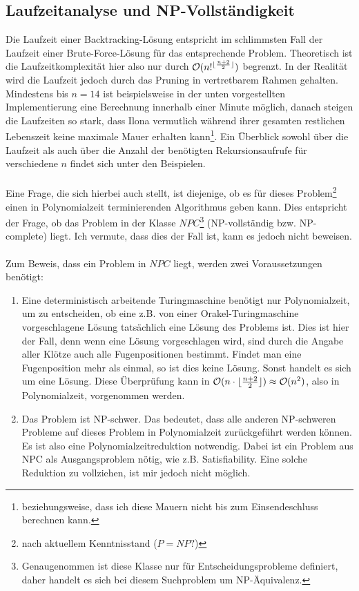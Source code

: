 \documentclass[a4paper, notitlepage, 12pt]{scrartcl}
\DeclarePairedDelimiter\floor{\lfloor}{\rfloor}
\begin{document}
\subsection{Laufzeitanalyse und NP-Vollständigkeit}
Die Laufzeit einer Backtracking-Lösung entspricht im schlimmsten Fall der Laufzeit einer Brute-Force-Lösung für das entsprechende Problem. Theoretisch ist die Laufzeitkomplexität hier also nur durch $\mathcal{O}(n!^{\floor{\frac{n + 2}{2}}})$ begrenzt. In der Realität wird die Laufzeit jedoch durch das Pruning in vertretbarem Rahmen gehalten. Mindestens bis $n = 14$ ist beispielsweise in der unten vorgestellten Implementierung eine Berechnung innerhalb einer Minute möglich, danach steigen die Laufzeiten so stark, dass Ilona vermutlich während ihrer gesamten restlichen Lebenszeit keine maximale Mauer erhalten kann\footnote{beziehungsweise, dass ich diese Mauern nicht bis zum Einsendeschluss berechnen kann.}. Ein Überblick sowohl über die Laufzeit als auch über die Anzahl der benötigten Rekursionsaufrufe für verschiedene $n$ findet sich unter den Beispielen. \\ \\
Eine Frage, die sich hierbei auch stellt, ist diejenige, ob es für dieses Problem\footnote{nach aktuellem Kenntnisstand ($P = NP ?$)} einen in Polynomialzeit terminierenden Algorithmus geben kann. Dies entspricht der Frage, ob das Problem in der Klasse $NPC$\footnote{Genaugenommen ist diese Klasse nur für Entscheidungsprobleme definiert, daher handelt es sich bei diesem Suchproblem um NP-Äquivalenz.} (NP-vollständig bzw. NP-complete) liegt. Ich vermute, dass dies der Fall ist, kann es jedoch nicht beweisen. \\ \\
Zum Beweis, dass ein Problem in $NPC$ liegt, werden zwei Voraussetzungen benötigt:
\begin{enumerate}
\item Eine deterministisch arbeitende Turingmaschine benötigt nur Polynomialzeit, um zu entscheiden, ob eine z.B. von einer Orakel-Turingmaschine vorgeschlagene Lösung tatsächlich eine Lösung des Problems ist. Dies ist hier der Fall, denn wenn eine Lösung vorgeschlagen wird, sind durch die Angabe aller Klötze auch alle Fugenpositionen bestimmt. Findet man eine Fugenposition mehr als einmal, so ist dies keine Lösung. Sonst handelt es sich um eine Lösung. Diese Überprüfung kann in $\mathcal{O}(n \cdot \floor{\frac{n + 2}{2}}) \approx \mathcal{O}(n^2)$, also in Polynomialzeit, vorgenommen werden.
\item Das Problem ist NP-schwer. Das bedeutet, dass alle anderen NP-schweren Probleme auf dieses Problem in Polynomialzeit zurückgeführt werden können. Es ist also eine Polynomialzeitreduktion notwendig. Dabei ist ein Problem aus NPC als Ausgangsproblem nötig, wie z.B. Satisfiability. Eine solche Reduktion zu vollziehen, ist mir jedoch nicht möglich.
\end{enumerate}
\end{document}
